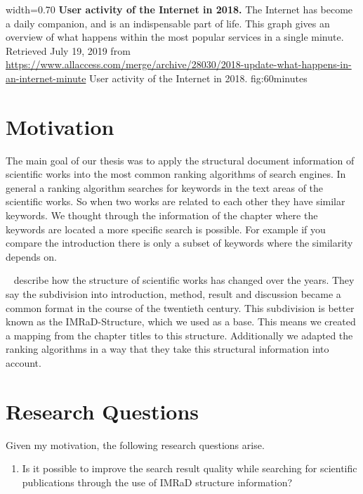       {width=0.70\textwidth}
      {\textbf{User activity of the Internet in 2018.} The Internet has become a daily companion, and is an indispensable part of life. This graph gives an overview of what happens within the most popular services in a single minute. Retrieved July 19, 2019 from \url{https://www.allaccess.com/merge/archive/28030/2018-update-what-happens-in-an-internet-minute}}
      {User activity of the Internet in 2018.}
      {fig:60minutes}

\section{Motivation}
\label{sec:Motivation}

The main goal of our thesis was to apply the structural document information of scientific works into the most common ranking algorithms of search engines. In general a ranking algorithm searches for keywords in the text areas of the scientific works. So when two works are related to each other they have similar keywords. We thought through the information of the chapter where the keywords are located a more specific search is possible. For example if you compare the introduction there is only a subset of keywords where the similarity depends on.

 ~\cite{Sollaci-The-2004} describe how the structure of scientific works has changed over the years. They say the subdivision into introduction, method, result and discussion became a common format in the course of the twentieth century. This subdivision is better known as the IMRaD-Structure, which we used as a base. This means we created a mapping from the chapter titles to this structure. Additionally we adapted the ranking algorithms in a way that they take this structural information into account.


\section{Research Questions}
\label{sec:research_questions}

Given my motivation, the following research questions arise.

\begin{enumerate}
  \item Is it possible to improve the search result quality while searching for scientific publications through the use of IMRaD structure information?
\end{enumerate}

